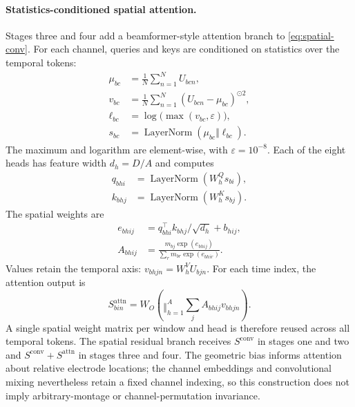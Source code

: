 \documentclass{article}
\DeclareMathOperator{\LN}{LayerNorm}
\begin{document}
\paragraph{Statistics-conditioned spatial attention.}
Stages three and four add a beamformer-style attention branch to
\cref{eq:spatial-conv}. For each channel, queries and keys are conditioned on
statistics over the temporal tokens:
\begin{align}
    \mu_{bc}&=\frac{1}{N}\sum_{n=1}^{N}U_{bcn},\\
    v_{bc}&=\frac{1}{N}\sum_{n=1}^{N}(U_{bcn}-\mu_{bc})^{\odot2},\\
    \ell_{bc}&=\log\bigl(\max(v_{bc},\varepsilon)\bigr),\\
    s_{bc}&=\LN(\mu_{bc}\Vert\ell_{bc}).
    \label{eq:channel-statistics}
\end{align}
The maximum and logarithm are element-wise, with $\varepsilon=10^{-8}$.
Each of the eight heads has feature width $d_h=D/A$ and computes
\begin{align}
    q_{bhi}&=\LN(W_h^Qs_{bi}),\\
    k_{bhj}&=\LN(W_h^Ks_{bj}).
\end{align}
The spatial weights are
\begin{align}
    e_{bhij}&=q_{bhi}^{\top}k_{bhj}/\sqrt{d_h}+b_{hij},\\
    A_{bhij}&=\frac{m_{bj}\exp(e_{bhij})}
                      {\sum_r m_{br}\exp(e_{bhir})}.
    \label{eq:spatial-attention}
\end{align}
Values retain the temporal axis: $v_{bhjn}=W_h^VU_{bjn}$.
For each time index, the attention output is
\begin{equation}
    S^{\mathrm{attn}}_{bin}
      =W_O\!\left(\mathop{\Vert}_{h=1}^{A}
        \sum_j A_{bhij}v_{bhjn}\right).
\end{equation}
A single spatial weight matrix per window and head is therefore reused
across all temporal tokens. The spatial residual branch receives
$S^{\mathrm{conv}}$ in stages one and two and
$S^{\mathrm{conv}}+S^{\mathrm{attn}}$ in stages three and four.
The geometric bias informs attention about relative electrode locations;
the channel embeddings and convolutional mixing nevertheless retain a fixed
channel indexing, so this construction does not imply arbitrary-montage
or channel-permutation invariance.
\end{document}
